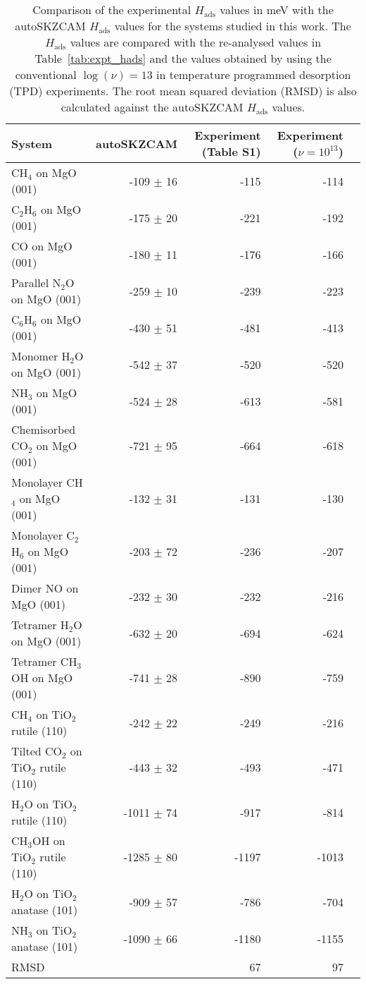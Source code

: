 \begin{table}
\caption{\label{tab:hads_nu13_comparison}Comparison of the experimental $H_\textrm{ads}$ values in meV with the autoSKZCAM $H_\textrm{ads}$ values for the systems studied in this work. The $H_\textrm{ads}$ values are compared with the re-analysed values in Table~\ref{tab:expt_hads} and the values obtained by using the conventional $\log(\nu)=13$ in temperature programmed desorption (TPD) experiments. The root mean squared deviation (RMSD) is also calculated against the autoSKZCAM $H_\textrm{ads}$ values.}
\begin{adjustbox}{center,max width=1\textwidth}
\begin{tabular}{lrrrr}
\toprule
System & autoSKZCAM & Experiment (Table S1) & Experiment ($\nu{=}10^{13}$) \\ 
\midrule
CH$_4$ on MgO (001) & -109 $\pm$ 16 & -115 & -114 \\
C$_2$H$_6$ on MgO (001) & -175 $\pm$ 20 & -221 & -192 \\
CO on MgO (001) & -180 $\pm$ 11 & -176 & -166 \\
Parallel N$_2$O on MgO (001) & -259 $\pm$ 10 & -239 & -223 \\
C$_6$H$_6$ on MgO (001) & -430 $\pm$ 51 & -481 & -413 \\
Monomer H$_2$O on MgO (001) & -542 $\pm$ 37 & -520 & -520 \\
NH$_3$ on MgO (001) & -524 $\pm$ 28 & -613 & -581 \\
Chemisorbed CO$_2$ on MgO (001) & -721 $\pm$ 95 & -664 & -618 \\
Monolayer CH$_4$ on MgO (001) & -132 $\pm$ 31 & -131 & -130 \\
Monolayer C$_2$H$_6$ on MgO (001) & -203 $\pm$ 72 & -236 & -207 \\
Dimer NO on MgO (001) & -232 $\pm$ 30 & -232 & -216 \\
Tetramer H$_2$O on MgO (001) & -632 $\pm$ 20 & -694 & -624 \\
Tetramer CH$_3$OH on MgO (001) & -741 $\pm$ 28 & -890 & -759 \\
CH$_4$ on TiO$_2$ rutile (110) & -242 $\pm$ 22 & -249 & -216 \\
Tilted CO$_2$ on TiO$_2$ rutile (110) & -443 $\pm$ 32 & -493 & -471 \\
H$_2$O on TiO$_2$ rutile (110) & -1011 $\pm$ 74 & -917 & -814 \\
CH$_3$OH on TiO$_2$ rutile (110) & -1285 $\pm$ 80 & -1197 & -1013 \\
H$_2$O on TiO$_2$ anatase (101) & -909 $\pm$ 57 & -786 & -704 \\
NH$_3$ on TiO$_2$ anatase (101) & -1090 $\pm$ 66 & -1180 & -1155 \\
RMSD &  & 67 & 97 \\
\bottomrule
\end{tabular}
\end{adjustbox}
\end{table}